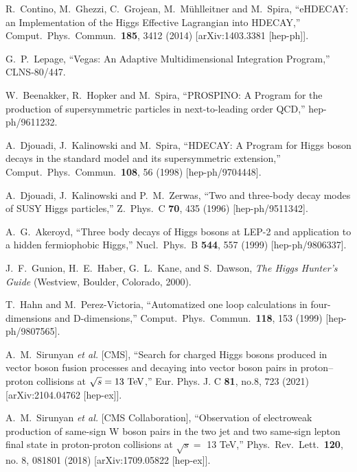 \documentclass[11pt]{article}
\begin{document}
\begin{thebibliography}{99}
  R.~Contino, M.~Ghezzi, C.~Grojean, M.~M\"uhlleitner and M.~Spira,
  ``eHDECAY: an Implementation of the Higgs Effective Lagrangian into HDECAY,''
  Comput.\ Phys.\ Commun.\  {\bf 185}, 3412 (2014)
  [arXiv:1403.3381 [hep-ph]].
  
  G.~P.~Lepage,
  ``Vegas: An Adaptive Multidimensional Integration Program,''
  CLNS-80/447.
  
  W.~Beenakker, R.~Hopker and M.~Spira,
  ``PROSPINO: A Program for the production of supersymmetric particles in next-to-leading order QCD,''
  hep-ph/9611232.
  
  A.~Djouadi, J.~Kalinowski and M.~Spira,
  ``HDECAY: A Program for Higgs boson decays in the standard model and its supersymmetric extension,''
  Comput.\ Phys.\ Commun.\  {\bf 108}, 56 (1998)
  [hep-ph/9704448].
  
  A.~Djouadi, J.~Kalinowski and P.~M.~Zerwas,
  ``Two and three-body decay modes of SUSY Higgs particles,''
  Z.\ Phys.\ C {\bf 70}, 435 (1996)
  [hep-ph/9511342].
  
  A.~G.~Akeroyd,
 ``Three body decays of Higgs bosons at LEP-2 and application to a hidden fermiophobic Higgs,''
  Nucl.\ Phys.\ B {\bf 544}, 557 (1999)
  [hep-ph/9806337].

J.~F.~Gunion, H.~E.~Haber, G.~L.~Kane, and S.~Dawson, 
{\it The Higgs Hunter's Guide} (Westview, Boulder, Colorado, 2000).

  T.~Hahn and M.~Perez-Victoria,
  ``Automatized one loop calculations in four-dimensions and D-dimensions,''
  Comput.\ Phys.\ Commun.\  {\bf 118}, 153 (1999)
  [hep-ph/9807565].

A.~M.~Sirunyan \textit{et al.} [CMS],
``Search for charged Higgs bosons produced in vector boson fusion processes and decaying into vector boson pairs in proton--proton collisions at $\sqrt{s} = 13~{\rm TeV}$,''
Eur. Phys. J. C \textbf{81}, no.8, 723 (2021)
[arXiv:2104.04762 [hep-ex]].

  A.~M.~Sirunyan {\it et al.} [CMS Collaboration],
  ``Observation of electroweak production of same-sign W boson pairs in the two jet and two same-sign lepton final state in proton-proton collisions at $\sqrt{s} = $ 13 TeV,''
  Phys.\ Rev.\ Lett.\  {\bf 120}, no. 8, 081801 (2018)
  [arXiv:1709.05822 [hep-ex]].


\end{thebibliography}
\end{document}

